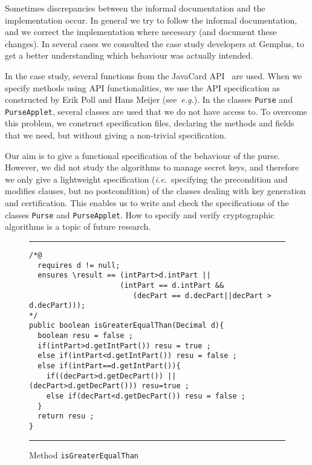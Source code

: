 \documentclass[a4paper]{llncs}
\begin{document}
Sometimes discrepancies between the informal documentation and the
implementation occur. In general we try to follow the informal
documentation, and we correct the implementation where necessary
(and document these changes). In several cases we consulted the case
study developers at Gemplus, to get a better understanding which
behaviour was actually intended.

In the case study, several functions from the JavaCard
API~\cite{JavaCardAPI} are used. When we specify methods using API
functionalities, we use the API specification as constructed by Erik
Poll and Hans Meijer (see~\emph{e.g.}\cite{MeijerP01}).  In the
classes \texttt{Purse} and \texttt{PurseApplet}, several classes are
used that we do not have access to. To overcome this problem, we
construct specification files, declaring the methods and fields that we need,
but without giving a non-trivial specification.

Our aim is to give a functional specification of the behaviour of the
purse. However, we did not study the algorithms to manage secret keys,
and therefore we only give a lightweight specification
(\emph{i.e.}~specifying the precondition and modifies clauses, but no
postcondition) of the classes dealing with key generation and
certification. This enables us to write and check the specifications of
the classes \texttt{Purse} and \texttt{PurseApplet}. How to specify
and verify cryptographic algorithms is a topic of future research.

\begin{figure}[t]
\rule{\linewidth}{0.3mm}
\begin{verbatim}
/*@
  requires d != null;
  ensures \result == (intPart>d.intPart ||
                     (intPart == d.intPart && 
                        (decPart == d.decPart||decPart > d.decPart)));
*/
public boolean isGreaterEqualThan(Decimal d){
  boolean resu = false ;
  if(intPart>d.getIntPart()) resu = true ;
  else if(intPart<d.getIntPart()) resu = false ;
  else if(intPart==d.getIntPart()){
    if((decPart>d.getDecPart()) || (decPart>d.getDecPart())) resu=true ;
    else if(decPart<d.getDecPart()) resu = false ;
  }
  return resu ;
}
\end{verbatim}
\caption{Method {\tt isGreaterEqualThan}}
\label{fig-cla-dec}
\rule{\linewidth}{0.3mm}
\end{figure}
\end{document}
